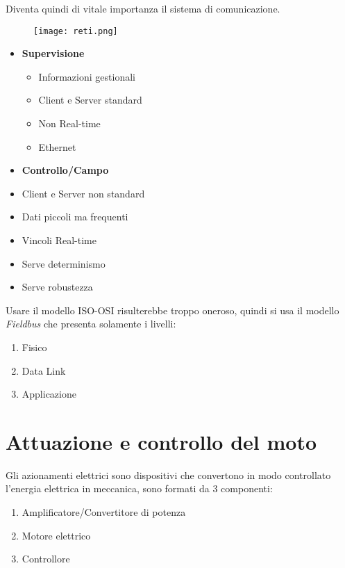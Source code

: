 \documentclass{article}
\begin{document}
\noindent Diventa quindi di vitale importanza il sistema di comunicazione.

\newpage

\begin{figure}[ht]
    \centering
    \texttt{[image: reti.png]}
\end{figure}

\begin{itemize}
    \item \textbf{Supervisione}
        \begin{itemize}
            \item Informazioni gestionali
            \item Client e Server standard
            \item Non Real-time
            \item Ethernet
        \end{itemize}
    \item \textbf{Controllo/Campo}

            \item Client e Server non standard    
            \item Dati piccoli ma frequenti
            \item Vincoli Real-time
            \item Serve determinismo
            \item Serve robustezza\newline

\end{itemize}

\noindent Usare il modello ISO-OSI risulterebbe troppo oneroso, quindi si usa il modello \textit{Fieldbus} che presenta solamente i livelli:
\begin{enumerate}
    \item Fisico
    \item Data Link
    \item Applicazione
\end{enumerate}

\section{Attuazione e controllo del moto}

Gli azionamenti elettrici sono dispositivi che convertono in modo controllato l'energia elettrica in meccanica, sono formati da 3 componenti:
\begin{enumerate}
    \item Amplificatore/Convertitore di potenza
    \item Motore elettrico
    \item Controllore\newline
\end{enumerate}
\end{document}
